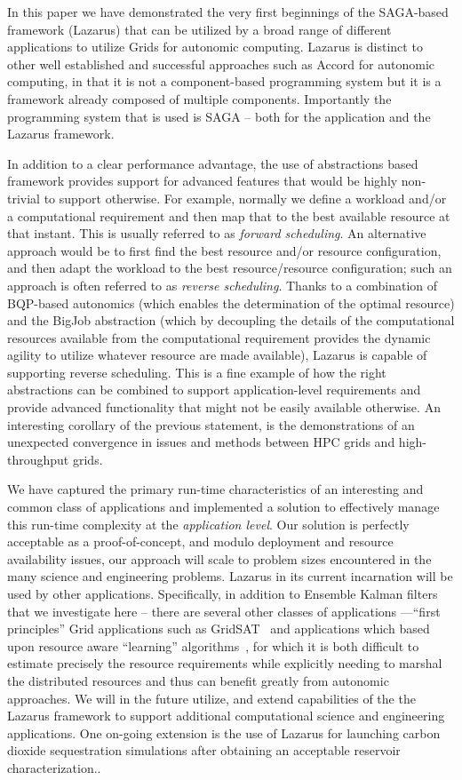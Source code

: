\documentclass{sig-alternate}
\begin{document}
In this paper we have demonstrated the very first beginnings of the
SAGA-based framework (Lazarus) that can be utilized by a broad range
of different applications to utilize Grids for autonomic computing.
Lazarus is distinct to other well established and successful
approaches such as Accord for autonomic computing, in that it is not a
component-based programming system but it is a framework already
composed of multiple components. Importantly the programming system
that is used is SAGA -- both for the application and the Lazarus
framework.

In addition to a clear performance advantage, the use of abstractions based framework provides support for advanced features that would be highly non-trivial to support otherwise.  For example, normally we define a workload and/or a computational requirement and then map that to the best available resource at that instant.  This is usually referred to as {\it forward scheduling}.  An alternative approach would be to first find the best resource and/or resource configuration, and then adapt the workload to the best resource/resource configuration; such an approach is often referred to as {\it reverse scheduling}.  Thanks to a combination of BQP-based autonomics (which enables the determination of the optimal resource) and the BigJob abstraction (which by decoupling the details of the computational resources available from the computational requirement provides the dynamic agility to utilize whatever resource are made available), Lazarus is capable of supporting reverse scheduling. This is a fine example of how the right abstractions can be combined to support application-level requirements and provide advanced functionality that might not be easily available otherwise.  An interesting corollary of the previous statement, is the demonstrations of an unexpected convergence in issues and methods between HPC grids and high-throughput grids.

We have captured the primary run-time characteristics of an
interesting and common class of applications and implemented a
solution to effectively manage this run-time complexity at the {\it
  application level}.  Our solution is perfectly acceptable as a
proof-of-concept, and modulo deployment and resource availability
issues, our approach will scale to problem sizes encountered in the
many science and engineering problems.  Lazarus in its current
incarnation will be used by other applications. Specifically, in
addition to Ensemble Kalman filters %
that we investigate here -- there are several other classes of
applications ---``first principles'' Grid applications such as
GridSAT~\cite{gridsat03} and applications which based upon resource
aware ``learning'' algorithms~\cite{ majority_voting}, for which it is
both difficult to estimate precisely the resource requirements while
explicitly needing to marshal the distributed resources and thus can
benefit greatly from autonomic approaches. We will in the future
utilize, and extend capabilities of the the Lazarus framework to
support additional computational science and engineering applications.
One on-going extension is the use of Lazarus for launching carbon dioxide sequestration
simulations after obtaining an acceptable reservoir characterization..
\end{document}
